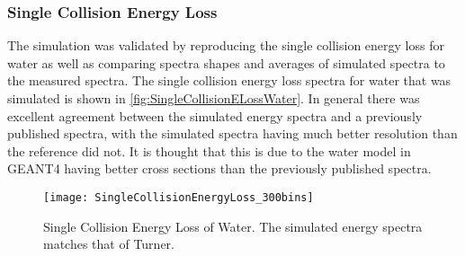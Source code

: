 \subsubsection{Single Collision Energy Loss}
The simulation was validated by reproducing the single collision energy loss for water as well as comparing spectra shapes and averages of simulated spectra to the measured spectra.
The single collision energy loss spectra for water that was simulated is shown in \autoref{fig:SingleCollisionELossWater}.
In general there was excellent agreement between the simulated energy spectra and a previously published spectra\cite{turner_comparative_1982}, with the simulated spectra having much better resolution than the reference did not.
It is thought that this is due to the water model in GEANT4 having better cross sections than the previously published spectra.
\begin{figure}[ht]
  \centering
  \texttt{[image: SingleCollisionEnergyLoss\_300bins]}
  \caption{Single Collision Energy Loss of Water. The simulated energy spectra matches that of Turner\cite{turner_comparative_1982}.}
	\label{fig:SingleCollisionELossWater}
\end{figure}

